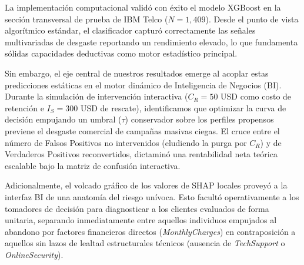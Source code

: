 La implementación computacional validó con éxito el modelo XGBoost en la sección transversal de prueba de IBM Telco ($N=1,409$). Desde el punto de vista algorítmico estándar, el clasificador capturó correctamente las señales multivariadas de desgaste reportando un rendimiento elevado, lo que fundamenta sólidas capacidades deductivas como motor estadístico principal.

Sin embargo, el eje central de nuestros resultados emerge al acoplar estas predicciones estáticas en el motor dinámico de Inteligencia de Negocios (BI). Durante la simulación de intervención interactiva ($C_R = 50$ USD como costo de retención e $I_S = 300$ USD de rescate), identificamos que optimizar la curva de decisión empujando un umbral ($\tau$) conservador sobre los perfiles propensos previene el desgaste comercial de campañas masivas ciegas. El cruce entre el número de Falsos Positivos no intervenidos (eludiendo la purga por $C_R$) y de Verdaderos Positivos reconvertidos, dictaminó una rentabilidad neta teórica escalable bajo la matriz de confusión interactiva.

Adicionalmente, el volcado gráfico de los valores de SHAP locales proveyó a la interfaz BI de una anatomía del riesgo unívoca. Esto facultó operativamente a los tomadores de decisión para diagnosticar a los clientes evaluados de forma unitaria, separando inmediatamente entre aquellos individuos empujados al abandono por factores financieros directos (\textit{MonthlyCharges}) en contraposición a aquellos sin lazos de lealtad estructurales técnicos (ausencia de \textit{TechSupport} o \textit{OnlineSecurity}).
